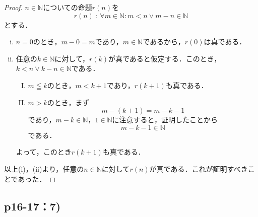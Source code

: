 \documentclass[a4paper,10pt,fleqn]{ltjsarticle}
\begin{document}
\begin{tleftbar}
    \begin{proof}
    $n \in \mathbb{N}$についての命題$r(n)$を
    \[
        r(n) ~{:}~ \forall m \in \mathbb{N} \colon  m<n \lor m-n  \in \mathbb{N}
    \]
    とする．
    \begin{enumerate}[(i)]
        \item $n=0$のとき，$m - 0 =m$であり，$m \in \mathbb{N}$であるから，$r(0)$は真である．
        \item 任意の$k \in \mathbb{N}$に対して，$r(k)$が真であると仮定する．このとき，$k<n \lor k-n  \in \mathbb{N}$である．
        \begin{enumerate}[(I)]
        \item $m \leqq   k$のとき，$m <k+1$であり，$r(k+1)$も真である．
        \item $m > k$のとき，まず
        \[
        m-(k+1)=m-k-1 
        \] であり，$m-k \in \mathbb{N}$，$1 \in \mathbb{N}$に注意すると，証明したことから
        \[
        m-k-1  \in \mathbb{N}
        \]
        である．
        \end{enumerate}
        よって，このとき$r(k+1)$も真である．
    \end{enumerate}
    以上(i)，(ii)より，任意の$n \in \mathbb{N}$に対して$r(n)$が真である．これが証明すべきことであった．
\end{proof}
\end{tleftbar}

\newpage 

\subsection*{p16-17：7)}
\end{document}
